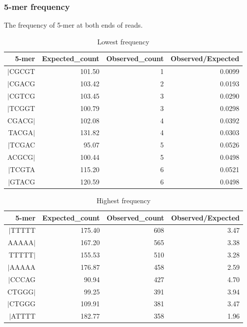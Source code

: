 \documentclass{article}
\begin{document}
\subsubsection{5-mer frequency}
The frequency of 5-mer at both ends of reads.
\begin{center}
{\scriptsize
\begin{longtable}{|r|r|r|r|}
\caption{Lowest frequency} \\ 
  \hline
5-mer & Expected\_count & Observed\_count & Observed/Expected \\ 
  \hline
$|$CGCGT & 101.50 & 1 & 0.0099 \\ 
   \rowcolor[gray]{0.9}$|$CGACG & 103.42 & 2 & 0.0193 \\ 
  $|$CGTCG & 103.45 & 3 & 0.0290 \\ 
   \rowcolor[gray]{0.9}$|$TCGGT & 100.79 & 3 & 0.0298 \\ 
  CGACG$|$ & 102.08 & 4 & 0.0392 \\ 
   \rowcolor[gray]{0.9}TACGA$|$ & 131.82 & 4 & 0.0303 \\ 
  $|$TCGAC &  95.07 & 5 & 0.0526 \\ 
   \rowcolor[gray]{0.9}ACGCG$|$ & 100.44 & 5 & 0.0498 \\ 
  $|$TCGTA & 115.20 & 6 & 0.0521 \\ 
   \rowcolor[gray]{0.9}$|$GTACG & 120.59 & 6 & 0.0498 \\ 
   \hline
\hline
\end{longtable}
}%
{\scriptsize
\begin{longtable}{|r|r|r|r|}
\caption{Highest frequency} \\ 
  \hline
5-mer & Expected\_count & Observed\_count & Observed/Expected \\ 
  \hline
$|$TTTTT & 175.40 & 608 & 3.47 \\ 
   \rowcolor[gray]{0.9}AAAAA$|$ & 167.20 & 565 & 3.38 \\ 
  TTTTT$|$ & 155.53 & 510 & 3.28 \\ 
   \rowcolor[gray]{0.9}$|$AAAAA & 176.87 & 458 & 2.59 \\ 
  $|$CCCAG &  90.94 & 427 & 4.70 \\ 
   \rowcolor[gray]{0.9}CTGGG$|$ &  99.25 & 391 & 3.94 \\ 
  $|$CTGGG & 109.91 & 381 & 3.47 \\ 
   \rowcolor[gray]{0.9}$|$ATTTT & 182.77 & 358 & 1.96 \\ 

\end{longtable}}
\end{center}
\end{document}
